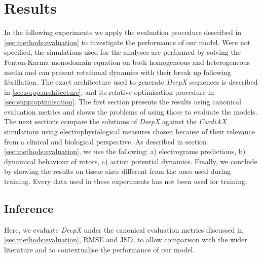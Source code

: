 \documentclass[utf8]{frontiersSCNS} %
\begin{document}
\section{Results}
\label{sec:results}
In the following experiments we apply the evaluation procedure described in \ref{sec:methods:evaluation} to investigate the performance of our model. Were not specified, the simulations used for the analyses are performed by solving the Fenton-Karma monodomain equation on both homogeneous and heterogeneous media and can present rotational dynamics with their break up following fibrillation. 
The exact architecture used to generate \textit{DeepX} sequences is described in \ref{sec:supp:architecture}, and its relative optimisation procedure in \ref{sec:supp:optimisation}.
The first section presents the results using canonical evaluation metrics and shows the problems of using those to evaluate the models.
The next sections compare the solutions of \textit{DeepX} against the \textit{CardiAX} simulations using electrophysiological measures chosen because of their relevance from a clinical and biological perspective. As described in section \ref{sec:methods:evaluation}, we use the following: a) electrograms predictions, b) dynamical behaviour of rotors, c) action potential dynamics.
Finally, we conclude by showing the results on tissue sizes different from the ones used during training.
Every data used in these experiments has not been used for training.

\subsection{Inference}
\label{sec:results:inference}
Here, we evaluate \textit{DeepX} under the canonical evaluation metrics discussed in \ref{sec:methods:evaluation}, RMSE and JSD, to allow comparison with the wider literature and to contextualise the performance of our model.
\end{document}
